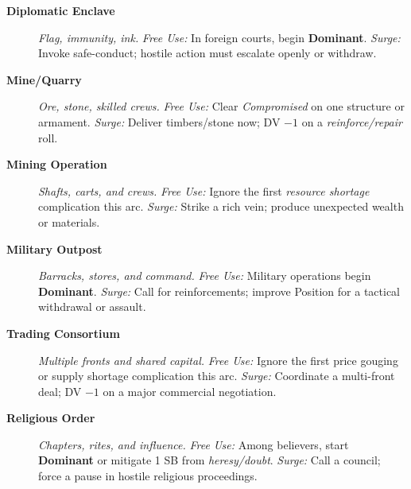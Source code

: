 \begin{description}
  \item[\textbf{Diplomatic Enclave}]  \emph{Flag, immunity, ink.} \emph{Free Use:} In foreign courts, begin \textbf{Dominant}. \emph{Surge:} Invoke safe-conduct; hostile action must escalate openly or withdraw.

  \item[\textbf{Mine/Quarry}]  \emph{Ore, stone, skilled crews.} \emph{Free Use:} Clear \emph{Compromised} on one structure or armament. \emph{Surge:} Deliver timbers/stone now; DV $-1$ on a \emph{reinforce/repair} roll.

  \item[\textbf{Mining Operation}]  \emph{Shafts, carts, and crews.} \emph{Free Use:} Ignore the first \emph{resource shortage} complication this arc. \emph{Surge:} Strike a rich vein; produce unexpected wealth or materials.

  \item[\textbf{Military Outpost}]  \emph{Barracks, stores, and command.} \emph{Free Use:} Military operations begin \textbf{Dominant}. \emph{Surge:} Call for reinforcements; improve Position for a tactical withdrawal or assault.

  \item[\textbf{Trading Consortium}]  \emph{Multiple fronts and shared capital.} \emph{Free Use:} Ignore the first price gouging or supply shortage complication this arc. \emph{Surge:} Coordinate a multi-front deal; DV $-1$ on a major commercial negotiation.

  \item[\textbf{Religious Order}]  \emph{Chapters, rites, and influence.} \emph{Free Use:} Among believers, start \textbf{Dominant} or mitigate 1 SB from \emph{heresy/doubt}. \emph{Surge:} Call a council; force a pause in hostile religious proceedings.
\end{description}


